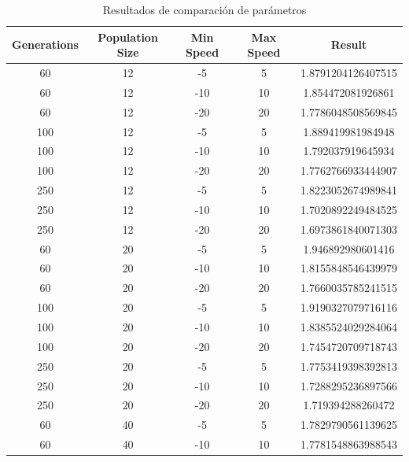 \documentclass[letterpaper]{report}
\begin{document}
    \begin{table}[ht!]
      \caption{Resultados de comparación de parámetros}
      \begin{center}
        \begin{tabular}{|c|c|c|c|c|}
          \hline
          Generations & Population Size & Min Speed & Max Speed & Result \\
          \hline
          60 & 12 & -5 & 5 & 1.8791204126407515 \\
          \hline
          60 & 12 & -10 & 10 & 1.854472081926861 \\
          \hline
          60 & 12 & -20 & 20 & 1.7786048508569845 \\
          \hline
          100 & 12 & -5 & 5 & 1.889419981984948 \\
          \hline
          100 & 12 & -10 & 10 & 1.792037919645934 \\
          \hline
          100 & 12 & -20 & 20 & 1.7762766933444907 \\
          \hline
          250 & 12 & -5 & 5 & 1.8223052674989841 \\
          \hline
          \rowcolor[HTML]{CCEEBB}
          250 & 12 & -10 & 10 & 1.7020892249484525 \\
          \hline
          \rowcolor[HTML]{CCEEBB}
          250 & 12 & -20 & 20 & 1.6973861840071303 \\
          \hline
          60 & 20 & -5 & 5 & 1.946892980601416 \\
          \hline
          60 & 20 & -10 & 10 & 1.8155848546439979 \\
          \hline
          60 & 20 & -20 & 20 & 1.7660035785241515 \\
          \hline
          100 & 20 & -5 & 5 & 1.9190327079716116 \\
          \hline
          100 & 20 & -10 & 10 & 1.8385524029284064 \\
          \hline
          100 & 20 & -20 & 20 & 1.7454720709718743 \\
          \hline
          250 & 20 & -5 & 5 & 1.7753419398392813 \\
          \hline
          250 & 20 & -10 & 10 & 1.7288295236897566 \\
          \hline
          250 & 20 & -20 & 20 & 1.719394288260472 \\
          \hline
          60 & 40 & -5 & 5 & 1.7829790561139625 \\
          \hline
          60 & 40 & -10 & 10 & 1.7781548863988543 \\

\end{tabular}
\end{center}
\end{table}
\end{document}
